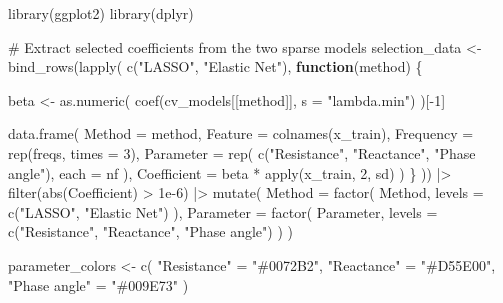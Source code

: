 \documentclass[
  letterpaper,
  DIV=11,
  numbers=noendperiod]{scrreprt}
\newenvironment{Shaded}{\begin{snugshade}}{\end{snugshade}}
\newcommand{\AttributeTok}[1]{\textcolor[rgb]{0.40,0.45,0.13}{#1}}
\newcommand{\CommentTok}[1]{\textcolor[rgb]{0.37,0.37,0.37}{#1}}
\newcommand{\ControlFlowTok}[1]{\textcolor[rgb]{0.00,0.23,0.31}{\textbf{#1}}}
\newcommand{\DecValTok}[1]{\textcolor[rgb]{0.68,0.00,0.00}{#1}}
\newcommand{\FloatTok}[1]{\textcolor[rgb]{0.68,0.00,0.00}{#1}}
\newcommand{\FunctionTok}[1]{\textcolor[rgb]{0.28,0.35,0.67}{#1}}
\newcommand{\NormalTok}[1]{\textcolor[rgb]{0.00,0.23,0.31}{#1}}
\newcommand{\OtherTok}[1]{\textcolor[rgb]{0.00,0.23,0.31}{#1}}
\newcommand{\SpecialCharTok}[1]{\textcolor[rgb]{0.37,0.37,0.37}{#1}}
\newcommand{\StringTok}[1]{\textcolor[rgb]{0.13,0.47,0.30}{#1}}
\begin{document}
\begin{Shaded}
\begin{Highlighting}[]
\FunctionTok{library}\NormalTok{(ggplot2)}
\FunctionTok{library}\NormalTok{(dplyr)}

\CommentTok{\# Extract selected coefficients from the two sparse models}
\NormalTok{selection\_data }\OtherTok{\textless{}{-}} \FunctionTok{bind\_rows}\NormalTok{(}\FunctionTok{lapply}\NormalTok{(}
  \FunctionTok{c}\NormalTok{(}\StringTok{"LASSO"}\NormalTok{, }\StringTok{"Elastic Net"}\NormalTok{),}
  \ControlFlowTok{function}\NormalTok{(method) \{}

\NormalTok{    beta }\OtherTok{\textless{}{-}} \FunctionTok{as.numeric}\NormalTok{(}
      \FunctionTok{coef}\NormalTok{(cv\_models[[method]], }\AttributeTok{s =} \StringTok{"lambda.min"}\NormalTok{)}
\NormalTok{    )[}\SpecialCharTok{{-}}\DecValTok{1}\NormalTok{]}

    \FunctionTok{data.frame}\NormalTok{(}
      \AttributeTok{Method =}\NormalTok{ method,}
      \AttributeTok{Feature =} \FunctionTok{colnames}\NormalTok{(x\_train),}
      \AttributeTok{Frequency =} \FunctionTok{rep}\NormalTok{(freqs, }\AttributeTok{times =} \DecValTok{3}\NormalTok{),}
      \AttributeTok{Parameter =} \FunctionTok{rep}\NormalTok{(}
        \FunctionTok{c}\NormalTok{(}\StringTok{"Resistance"}\NormalTok{, }\StringTok{"Reactance"}\NormalTok{, }\StringTok{"Phase angle"}\NormalTok{),}
        \AttributeTok{each =}\NormalTok{ nf}
\NormalTok{      ),}
      \AttributeTok{Coefficient =}\NormalTok{ beta }\SpecialCharTok{*} \FunctionTok{apply}\NormalTok{(x\_train, }\DecValTok{2}\NormalTok{, sd)}
\NormalTok{    )}
\NormalTok{  \}}
\NormalTok{)) }\SpecialCharTok{|\textgreater{}}
  \FunctionTok{filter}\NormalTok{(}\FunctionTok{abs}\NormalTok{(Coefficient) }\SpecialCharTok{\textgreater{}} \FloatTok{1e{-}6}\NormalTok{) }\SpecialCharTok{|\textgreater{}}
  \FunctionTok{mutate}\NormalTok{(}
    \AttributeTok{Method =} \FunctionTok{factor}\NormalTok{(}
\NormalTok{      Method,}
      \AttributeTok{levels =} \FunctionTok{c}\NormalTok{(}\StringTok{"LASSO"}\NormalTok{, }\StringTok{"Elastic Net"}\NormalTok{)}
\NormalTok{    ),}
    \AttributeTok{Parameter =} \FunctionTok{factor}\NormalTok{(}
\NormalTok{      Parameter,}
      \AttributeTok{levels =} \FunctionTok{c}\NormalTok{(}\StringTok{"Resistance"}\NormalTok{, }\StringTok{"Reactance"}\NormalTok{, }\StringTok{"Phase angle"}\NormalTok{)}
\NormalTok{    )}
\NormalTok{  )}

\NormalTok{parameter\_colors }\OtherTok{\textless{}{-}} \FunctionTok{c}\NormalTok{(}
  \StringTok{"Resistance"} \OtherTok{=} \StringTok{"\#0072B2"}\NormalTok{,}
  \StringTok{"Reactance"} \OtherTok{=} \StringTok{"\#D55E00"}\NormalTok{,}
  \StringTok{"Phase angle"} \OtherTok{=} \StringTok{"\#009E73"}
\NormalTok{)}


\end{Highlighting}
\end{Shaded}
\end{document}
